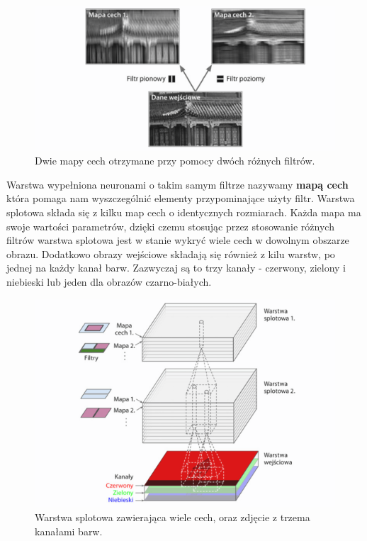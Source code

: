 \documentclass{article}
\begin{document}
\begin{itemize}
\begin{figure}[H]
\centering
\includegraphics[scale=0.6]{filtr.png}
\caption{Dwie mapy cech otrzymane przy pomocy dwóch różnych filtrów.}
\end{figure}

Warstwa wypełniona neuronami o takim
samym filtrze nazywamy \textbf{mapą cech} która pomaga nam wyszczególnić elementy przypominające
użyty filtr. Warstwa splotowa składa się z kilku map cech o identycznych rozmiarach.
Każda mapa ma swoje wartości parametrów, dzięki czemu stosując przez stosowanie różnych
filtrów warstwa splotowa jest w stanie wykryć wiele cech w dowolnym obszarze obrazu.
Dodatkowo obrazy wejściowe składają się również z kilu warstw, po jednej na każdy kanał
barw. Zazwyczaj są to trzy kanały - czerwony, zielony i niebieski lub jeden dla obrazów
czarno-białych.


\begin{figure}[H]
\centering
\includegraphics[scale=0.6]{rgb_cnn.png}
\caption{Warstwa splotowa zawierająca wiele cech, oraz zdjęcie z trzema kanałami barw.}
\end{figure}


\end{itemize}
\end{document}
